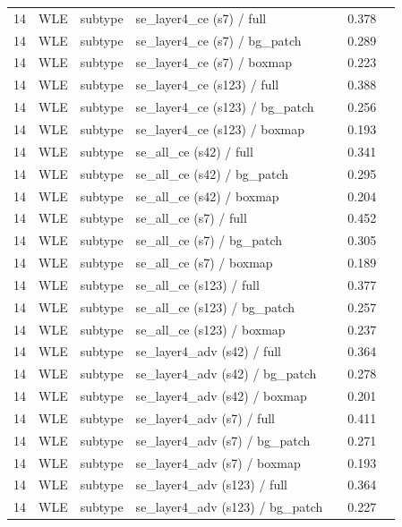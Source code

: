 \begin{longtable}{cL{1.1cm}L{1.5cm}L{5.6cm}ccc}
14 & WLE & subtype & se\_layer4\_ce (s7) / full & \nl{} & 0.378 & \nl{} \\
14 & WLE & subtype & se\_layer4\_ce (s7) / bg\_patch & \nl{} & 0.289 & \nl{} \\
14 & WLE & subtype & se\_layer4\_ce (s7) / boxmap & \nl{} & 0.223 & \nl{} \\
14 & WLE & subtype & se\_layer4\_ce (s123) / full & \nl{} & 0.388 & \nl{} \\
14 & WLE & subtype & se\_layer4\_ce (s123) / bg\_patch & \nl{} & 0.256 & \nl{} \\
14 & WLE & subtype & se\_layer4\_ce (s123) / boxmap & \nl{} & 0.193 & \nl{} \\
14 & WLE & subtype & se\_all\_ce (s42) / full & \nl{} & 0.341 & \nl{} \\
14 & WLE & subtype & se\_all\_ce (s42) / bg\_patch & \nl{} & 0.295 & \nl{} \\
14 & WLE & subtype & se\_all\_ce (s42) / boxmap & \nl{} & 0.204 & \nl{} \\
14 & WLE & subtype & se\_all\_ce (s7) / full & \nl{} & 0.452 & \nl{} \\
14 & WLE & subtype & se\_all\_ce (s7) / bg\_patch & \nl{} & 0.305 & \nl{} \\
14 & WLE & subtype & se\_all\_ce (s7) / boxmap & \nl{} & 0.189 & \nl{} \\
14 & WLE & subtype & se\_all\_ce (s123) / full & \nl{} & 0.377 & \nl{} \\
14 & WLE & subtype & se\_all\_ce (s123) / bg\_patch & \nl{} & 0.257 & \nl{} \\
14 & WLE & subtype & se\_all\_ce (s123) / boxmap & \nl{} & 0.237 & \nl{} \\
14 & WLE & subtype & se\_layer4\_adv (s42) / full & \nl{} & 0.364 & \nl{} \\
14 & WLE & subtype & se\_layer4\_adv (s42) / bg\_patch & \nl{} & 0.278 & \nl{} \\
14 & WLE & subtype & se\_layer4\_adv (s42) / boxmap & \nl{} & 0.201 & \nl{} \\
14 & WLE & subtype & se\_layer4\_adv (s7) / full & \nl{} & 0.411 & \nl{} \\
14 & WLE & subtype & se\_layer4\_adv (s7) / bg\_patch & \nl{} & 0.271 & \nl{} \\
14 & WLE & subtype & se\_layer4\_adv (s7) / boxmap & \nl{} & 0.193 & \nl{} \\
14 & WLE & subtype & se\_layer4\_adv (s123) / full & \nl{} & 0.364 & \nl{} \\
14 & WLE & subtype & se\_layer4\_adv (s123) / bg\_patch & \nl{} & 0.227 & \nl{} \\

\end{longtable}
